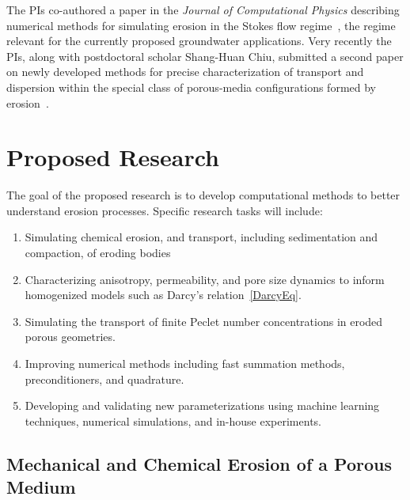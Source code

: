 \documentclass[11pt]{article}
\begin{document}
The PIs co-authored a paper in the {\em Journal of Computational Physics} describing numerical methods for simulating erosion in the Stokes flow regime~\cite{Quaife2018}, the regime relevant for the currently proposed groundwater applications. Very recently the PIs, along with postdoctoral scholar Shang-Huan Chiu, submitted a second paper on newly developed methods for precise characterization of transport and dispersion within the special class of porous-media configurations formed by erosion~\cite{chi-moo-qua2019}.

\section{Proposed Research} 
The goal of the proposed research is to develop computational methods to better understand erosion processes. Specific research tasks will include:
\begin{enumerate}[noitemsep,label=(\arabic*)]
  \item Simulating chemical erosion, and transport, including sedimentation and compaction, of eroding bodies 

  \item Characterizing anisotropy, permeability, and pore size dynamics to inform homogenized models such as Darcy's relation~\eqref{DarcyEq}.

  \item Simulating the transport of finite Peclet number concentrations in eroded porous geometries.

  \item Improving numerical methods including fast summation methods, preconditioners, and quadrature.  
  
  \item Developing and validating new parameterizations using machine learning techniques, numerical simulations, and in-house experiments.

\end{enumerate}



\subsection{Mechanical and Chemical Erosion of a Porous Medium}
\end{document}
